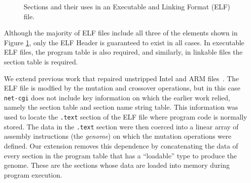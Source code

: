 \documentclass{sigcomm-alternate}
\begin{document}
\begin{figure}[htb]
  \centering
\caption{\label{elf}Sections and their uses in an Executable and
  Linking Format (ELF) file.}
\end{figure}

\noindent Although the majority of ELF files
include all three of the elements shown in Figure \ref{elf}, only the
ELF Header is guaranteed to exist in all cases.  In executable ELF
files, the program table is also required, and similarly, in linkable
files the section table is required.

We extend previous work that repaired unstripped Intel and ARM
files~\cite{schulte2013embedded}.  The ELF file is modfied by the
mutation and crossover operations, but in this case \texttt{net-cgi}
does not include key information on which the earlier work relied,
namely the section table and section name string table.  This
information was used to locate the \texttt{.text} section of the ELF
file where program code is normally stored.  The data in the
\texttt{.text} section were then coerced into a linear array of
assembly instructions (the \emph{genome}) on which the mutation
operations were defined.  Our extension removes this dependence by
concatenating the data of every section in the program table that has
a ``loadable'' type to produce the genome.  These are the sections
whose data are loaded into memory during program execution.
\end{document}
